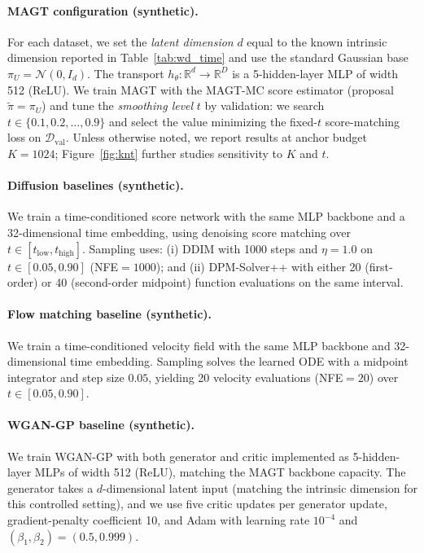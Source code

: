 \documentclass[12pt]{article}
\theoremstyle{definition} %
\newcommand{\R}{\mathbb{R}}
\providecommand{\method}{MAGT} %
\newcommand{\cN}{\mathcal{N}}
\begin{document}
\paragraph{\method{} configuration (synthetic).}
For each dataset, we set the \emph{latent dimension} $d$ equal to the known intrinsic dimension reported in Table~\ref{tab:wd_time} and use the standard Gaussian base $\pi_U=\cN(0,I_d)$.
The transport $h_{\theta}:\R^d\to\R^D$ is a 5-hidden-layer MLP of width 512 (ReLU).
We train \method{} with the \method{}-MC score estimator (proposal $\tilde\pi=\pi_U$) and tune the \emph{smoothing level} $t$ by validation:
we search $t\in\{0.1,0.2,\ldots,0.9\}$ and select the value minimizing the fixed-$t$ score-matching loss on $\mathcal{D}_{\text{val}}$.
Unless otherwise noted, we report results at anchor budget $K=1024$; Figure~\ref{fig:knt} further studies sensitivity to $K$ and $t$.

\paragraph{Diffusion baselines (synthetic).}
We train a time-conditioned score network with the same MLP backbone and a 32-dimensional time embedding, using denoising score matching over $t\in[t_{\mathrm{low}},t_{\mathrm{high}}]$.
Sampling uses:
(i) DDIM \citep{song2020ddim} with 1000 steps and $\eta=1.0$ on $t\in[0.05,0.90]$ (NFE$=1000$); and
(ii) DPM-Solver++ \citep{lu2022dpmsolver} with either 20 (first-order) or 40 (second-order midpoint) function evaluations on the same interval.

\paragraph{Flow matching baseline (synthetic).}
We train a time-conditioned velocity field with the same MLP backbone and 32-dimensional time embedding.
Sampling solves the learned ODE with a midpoint integrator and step size $0.05$, yielding 20 velocity evaluations (NFE$=20$) over $t\in[0.05,0.90]$.

\paragraph{WGAN-GP baseline (synthetic).}
We train WGAN-GP \citep{arjovsky2017wasserstein,gulrajani2017improved} with both generator and critic implemented as 5-hidden-layer MLPs of width 512 (ReLU), matching the \method{} backbone capacity.
The generator takes a $d$-dimensional latent input (matching the intrinsic dimension for this controlled setting), and we use five critic updates per generator update, gradient-penalty coefficient 10, and Adam with learning rate $10^{-4}$ and $(\beta_1,\beta_2)=(0.5,0.999)$.
\end{document}
